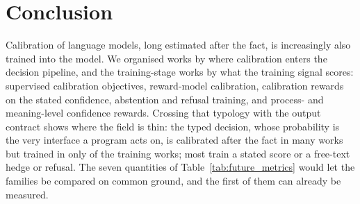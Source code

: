 \section{Conclusion}
\label{sec:conclusion}

Calibration of language models, long estimated after the fact, is increasingly also trained into the
model. We organised \nWorks works by where calibration enters the decision pipeline, and the
\nCore training-stage works by what the training signal scores: supervised calibration objectives,
reward-model calibration, calibration rewards on the stated confidence, abstention and refusal training,
and process- and meaning-level confidence rewards. Crossing that typology with the output contract shows
where the field is thin: the typed decision, whose probability is the very interface a program acts
on, is calibrated after the fact in many works but trained in only \nCoreTyped of the \nCore training works;
most train a stated score or a free-text hedge or refusal. The seven quantities of
Table~\ref{tab:future_metrics} would let the families be compared on common ground, and the first of
them can already be measured.
